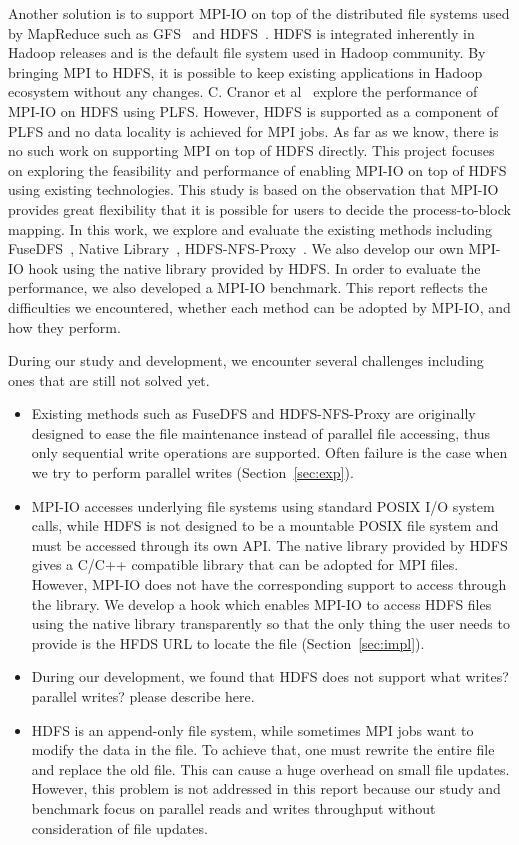 Another solution is to support MPI-IO on top of the distributed file systems
used by MapReduce such as GFS~\cite{gfs} and HDFS~\cite{hdfs}. HDFS is integrated
inherently in Hadoop releases and is the default file system used in Hadoop
community. By bringing MPI to HDFS, it is possible to keep existing applications
in Hadoop ecosystem without any changes. C. Cranor et al~\cite{CMU-PDL-12-115} explore the
performance of MPI-IO on HDFS using PLFS. However, HDFS is supported as a
component of PLFS and no data locality is achieved for MPI jobs. As far as we
know, there is no such work on supporting MPI on top of HDFS directly. This
project focuses on exploring the feasibility and performance of enabling MPI-IO
on top of HDFS using existing technologies. This study is based on the
observation that MPI-IO provides great flexibility that it is possible for users
to decide the process-to-block mapping. In this work, we explore and evaluate
the existing methods including FuseDFS~\cite{fuse}, Native Library~\cite{lib},
HDFS-NFS-Proxy~\cite{proxy}. We also develop our own MPI-IO hook using the
native library provided by HDFS. In order to evaluate the performance, we also
developed a MPI-IO benchmark. This report reflects the difficulties we
encountered, whether each method can be adopted by MPI-IO, and how they perform. 

During our study and development, we encounter several
challenges including ones that are still not solved yet.
\begin{itemize}
\item Existing methods such as FuseDFS and HDFS-NFS-Proxy are originally designed to ease the file
	maintenance instead of parallel file accessing, thus only sequential
	write operations are supported. Often failure is the case when we try to
	perform parallel writes (Section~\ref{sec:exp}). 
\item MPI-IO accesses underlying file systems using standard POSIX I/O system
	calls, while HDFS is not designed to be a mountable POSIX file system
	and must be accessed through its own API. The native library provided by
	HDFS gives a C/C++ compatible library that can be adopted for MPI files.
	However, MPI-IO does not have the corresponding support to access
	through the library. We develop a hook which enables MPI-IO to access
	HDFS files using the native library transparently so that the only thing
	the user needs to provide is the HFDS URL to locate the file
	(Section~\ref{sec:impl}).
\item During our development, we found that HDFS does not support 
{\color{red} what writes? parallel writes? please describe here. }
\item HDFS is an append-only file system, while sometimes MPI jobs want to
	modify the data in the file. To achieve that, one must rewrite the
	entire file and replace the old file. This can cause a huge overhead on
	small file updates. However, this problem is not addressed in this
	report because our study and benchmark focus on parallel reads and
	writes throughput without consideration of file updates.
\end{itemize}

